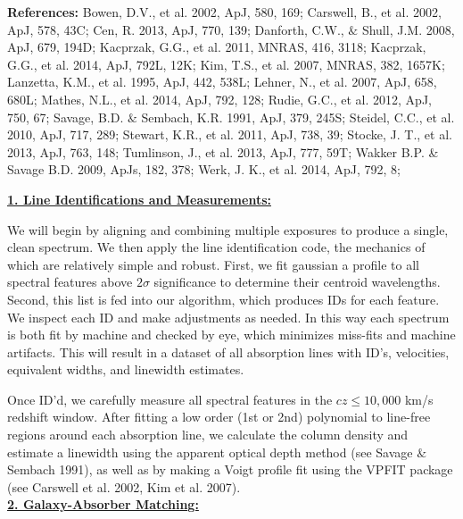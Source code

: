 \documentclass[12pt]{article}
\begin{document}
\noindent \textbf{References: } Bowen, D.V., et al. 2002, ApJ, 580, 169; Carswell, B., et al. 2002, ApJ, 578, 43C; Cen, R. 2013, ApJ, 770, 139; Danforth, C.W., $\&$ Shull, J.M. 2008, ApJ, 679, 194D; Kacprzak, G.G., et al. 2011, MNRAS, 416, 3118; Kacprzak, G.G., et al. 2014, ApJ, 792L, 12K; Kim, T.S., et al. 2007, MNRAS, 382, 1657K; Lanzetta, K.M., et al. 1995, ApJ, 442, 538L; Lehner, N., et al. 2007, ApJ, 658, 680L; Mathes, N.L., et al. 2014, ApJ, 792, 128; Rudie, G.C., et al. 2012, ApJ,  750, 67; Savage, B.D. $\&$ Sembach, K.R. 1991, ApJ, 379, 245S; Steidel, C.C., et al. 2010, ApJ, 717, 289; Stewart, K.R., et al. 2011, ApJ, 738, 39; Stocke, J. T., et al. 2013, ApJ, 763, 148; Tumlinson, J., et al. 2013, ApJ, 777, 59T; Wakker B.P. \& Savage B.D. 2009, ApJs, 182, 378; Werk, J. K., et al. 2014, ApJ, 792, 8; 

%
%
\describearchival       %

\noindent \textbf{\underline{1. Line Identifications and Measurements:}}

We will begin by aligning and combining multiple exposures to produce a single, clean spectrum. We then apply the line identification code, the mechanics of which are relatively simple and robust. First, we fit gaussian a profile to all spectral features above $2\sigma$ significance to determine their centroid wavelengths. Second, this list is fed into our algorithm, which produces IDs for each feature. We inspect each ID and make adjustments as needed. In this way each spectrum is both fit by machine and checked by eye, which minimizes miss-fits and machine artifacts. This will result in a dataset of all absorption lines with ID's, velocities, equivalent widths, and linewidth estimates.

Once ID'd, we carefully measure all spectral features in the $cz\le 10,000$ km/s redshift window. After fitting a low order (1st or 2nd) polynomial to line-free regions around each absorption line, we calculate the column density and estimate a linewidth using the apparent optical depth method (see Savage $\&$ Sembach 1991), as well as by making a Voigt profile fit using the VPFIT package (see Carswell et al. 2002, Kim et al. 2007).\\

\noindent \textbf{\underline{2. Galaxy-Absorber Matching:}}
\end{document}
